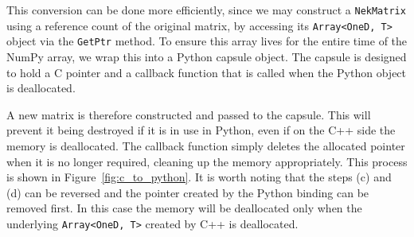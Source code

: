 This conversion can be done more efficiently, since we may construct a
\texttt{NekMatrix} using a reference count of the original matrix, by accessing
its \texttt{Array<OneD, T>} object via the \texttt{GetPtr} method. To ensure
this array lives for the entire time of the NumPy array, we wrap this into a
Python capsule object. The capsule is designed to hold a C pointer and a
callback function that is called when the Python object is deallocated.

A new matrix is therefore constructed and passed to the capsule. This will
prevent it being destroyed if it is in use in Python, even if on the C++ side
the memory is deallocated. The callback function simply deletes the allocated
pointer when it is no longer required, cleaning up the memory
appropriately. This process is shown in Figure~\ref{fig:c_to_python}. It is
worth noting that the steps (c) and (d) can be reversed and the pointer created
by the Python binding can be removed first.  In this case the memory will be
deallocated only when the underlying \texttt{Array<OneD, T>} created by C++ is
deallocated.

